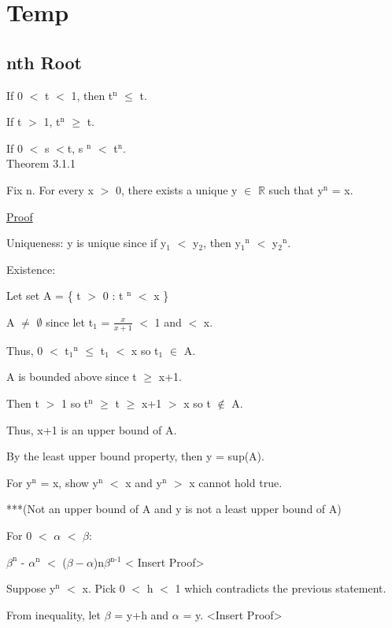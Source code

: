 \newpage

\section[Day 3]{Temp}

\subsection{nth Root}

If 0 $<$ t $<$ 1, then t$^\text{n}$ $ \leq $ t.

If t $>$ 1, t$^\text{n}$ $ \geq $ t.

If 0 $<$ s $<$t, s $^\text{n}$ $<$ t$^\text{n}$. \\

{ \color{blue} Theorem 3.1.1  }

\qquad Fix n. For every x $>$ 0, there exists a unique y $\in$ $ \mathbb{R} $ such that
	y$^\text{n}$ = x.

{ \color{magenta} \underline{Proof} } 

Uniqueness: y is unique since if y$_{1}$ $<$ y$_{2}$, then y$_{1}$$^\text{n}$ $<$ y$_{2}$$^\text{n}$.

Existence:

Let set A = \{ t $>$ 0 : t $^\text{n}$ $<$ x \}

A $\not =$ $\emptyset$ since let t$_{1}$ = $\frac{x}{x+1}$ $<$ 1 and $<$ x.

Thus, 0 $<$ t$_{1}$$^\text{n}$ $ \leq $ t$_{1}$ $<$ x so t$_{1}$ $\in$ A.

A is bounded above since t $ \geq $ x+1.

Then t $>$ 1 so t$^\text{n}$ $ \geq $ t $ \geq $ x+1 $>$ x so t $\not \in$ A.

Thus, x+1 is an upper bound of A.

By the least upper bound property, then y = sup(A).

For y$^\text{n}$ = x, show y$^\text{n}$ $<$ x and y$^\text{n}$ $>$ x cannot hold true.

***(Not an upper bound of A and y is not a least upper bound of A)

For 0 $<$ $\alpha$ $<$ $\beta$:

\qquad $\beta ^\text{n}$ - $\alpha^\text{n}$ $<$ ($\beta - \alpha$)n$\beta$$^\text{n-1}$ 
{<\color{red} Insert Proof>}

Suppose y$^\text{n}$ $<$ x. Pick 0 $<$ h $<$ 1 which contradicts the previous statement.

From inequality, let $\beta$ = y+h and $\alpha$ = y. <Insert Proof>

